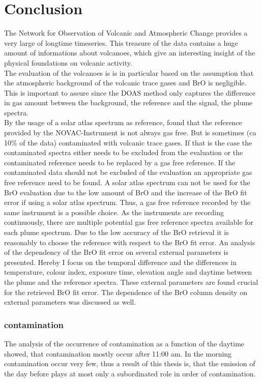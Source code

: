 \documentclass  [
  paper    = a4,
  BCOR     = 10mm,
  twoside,
  fontsize = 12pt,
  fleqn,
  toc      = bibnumbered,
  toc      = listofnumbered,
  numbers  = noendperiod,
  headings = normal,
  listof   = leveldown,
  version  = 3.03
]                                       {scrreprt}
\begin{document}
	\chapter{Conclusion}
	
	The Network for Observation of Volcanic and Atmospheric Change provides a very large of longtime timeseries. This treasure of the data contains a huge amount of informations about volcanoes, which give an interesting insight of the physical foundations on volcanic activity.\\
	The evaluation of the volcanoes is is in particular based on the assumption that the atmospheric background of the volcanic trace gases  and BrO is negligible. This is important to assure since the DOAS method only captures the difference in gas amount between the background, the reference and the signal, the plume spectra.\\
	By the usage of a solar atlas spectrum as reference, \citet{lubcke2014bro} found  that the reference provided by the NOVAC-Instrument is not always gas free. But is sometimes (ca 10\% of the data) contaminated with volcanic trace gases. If that is the case the contaminated spectra either needs to be excluded from the evaluation or the contaminated reference needs to be replaced by a gas free reference. If the contaminated data should not be excluded of the evaluation an appropriate gas free reference  need to be found. A solar atlas spectrum can not be used for the BrO evaluation due to the low amount of BrO and the increase of the BrO fit error if using a solar atlas spectrum. Thus, a gas free reference recorded by the same instrument is a possible choice.
	As the instruments are recording continuously, there are multiple potential gas free reference spectra available for each plume spectrum. Due to the low accuracy of the BrO retrieval it is reasonably to choose the reference with respect to the BrO fit error.
	An analysis of the dependency of the BrO fit error on several external parameters is presented. Hereby I focus on the temporal difference and the differences in temperature, colour index, exposure time, elevation angle and daytime between the plume and the reference spectra. These external parameters are found crucial for the retrieved BrO fit error. The dependence of the BrO column density on external parameters was discussed as well.
	\subsection*{ contamination}
	 The analysis of the occurrence of contamination as a function of the daytime showed, that contamination mostly occur after 11:00 am. In the morning contamination occur very few, thus a result of this thesis is, that the emission of the day before plays at most only a subordinated role in order of  contamination. 
\end{document}
